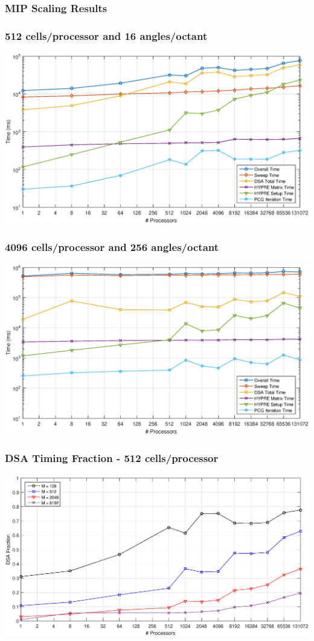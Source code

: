 \documentclass[compress,10pt]{beamer}
\begin{document}
\begin{frame}[t]
{
\frametitle{MIP Scaling Results}

}
{
\frametitle{512 cells/processor and 16 angles/octant}
\centering
\includegraphics[width=\textwidth]{images/A128.eps}
}
{
\frametitle{4096 cells/processor and 256 angles/octant}
\centering
\includegraphics[width=\textwidth]{images/A2048.eps}
}
{
\frametitle{DSA Timing Fraction - 512 cells/processor}
\centering
\includegraphics[width=\textwidth]{images/C512.eps}
}
\end{frame}
\end{document}
